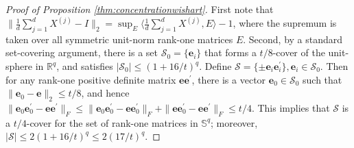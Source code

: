 \documentclass[11pt,letterpaper]{article}
\newcommand{\R}{\mathbb{R}}
\newcommand{\be}{\mathbf{e}}
\begin{document}
\begin{proof}[Proof of Proposition \ref{thm:concentrationwishart}]
	First note that $ \|\frac{1}{d}\sum_{j=1}^{d} X^{(j)} - I  \|_2 =\sup_{E} \langle \frac{1}{d}\sum_{j=1}^{d} X^{(j)} , E \rangle - 1$, where the supremum is taken over all symmetric unit-norm rank-one matrices $E$.  Second, by a standard set-covering argument, there is a set $\mathcal{S}_0 =\{\be_i \}$ that forms a $t / 8$-cover of the unit-sphere in $\R^q$, and satisfies $|\mathcal{S}_0| \leq (1+ 16/t)^{q}$.  Define $\mathcal{S} =\{ \pm \be_i \be_i^{\prime} \}, \be_i \in \mathcal{S}_0$.  Then for any rank-one positive definite matrix $\be \be^{\prime}$, there is a vector $\be_0 \in \mathcal{S}_0$ such that $\|\be_0 - \be\|_2 \leq t/8$, and hence $\|\be_0 \be_0^{\prime} - \be \be^{\prime}\|_F \leq \|\be_0 \be_0^{\prime} - \be \be_0^{\prime}\|_F + \|\be \be_0^{\prime} - \be \be^{\prime}\|_F \leq t/4$.  This implies that $\mathcal{S}$ is a $t/4$-cover for the set of rank-one matrices in $\mathbb{S}^{q}$; moreover, $|\mathcal{S}|\leq 2(1+ 16/t)^{q} \leq 2(17/t)^{q}$.
	

\end{proof}
\end{document}
